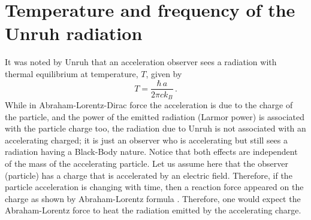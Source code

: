 \documentclass[a4]{epl2}
\begin{document}
\section{\textcolor[rgb]{0.00,0.07,1.00}{Temperature and frequency of the Unruh radiation}}

It was noted by Unruh that an acceleration observer sees a radiation with thermal equilibrium at temperature, $T$, given by \textcolor[rgb]{0.00,0.07,1.00}{\cite{unruh}}
\begin{equation}
T=\frac{\hbar\, a}{2\pi c k_B}\,.
\end{equation}
While in Abraham-Lorentz-Dirac force the acceleration is due to the charge of the particle, and the power of the emitted radiation (Larmor power) is associated with the particle charge too, the radiation due to Unruh is not associated with an accelerating  charged; it is just an observer who is accelerating but still sees a radiation  having a Black-Body nature.  Notice that both effects are independent of the mass of the accelerating particle. Let us assume here that the observer (particle) has a charge that is accelerated by an electric field. Therefore, if the particle acceleration is changing with time, then a reaction force appeared on the charge as shown by Abraham-Lorentz formula \textcolor[rgb]{0.00,0.07,1.00}{\cite{abraham,lorentz}}. Therefore, one would expect the Abraham-Lorentz force to heat the radiation emitted by the accelerating charge.
\end{document}
